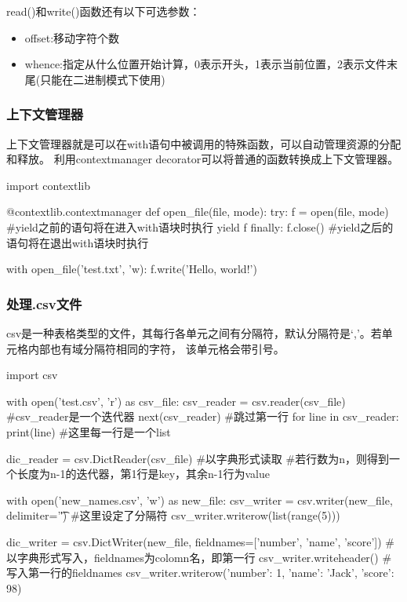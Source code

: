 \documentclass{article}
\begin{document}
        read()和write()函数还有以下可选参数：
        \begin{itemize}
          \item offset:移动字符个数
          \item whence:指定从什么位置开始计算，0表示开头，1表示当前位置，2表示文件末尾(只能在二进制模式下使用)
        \end{itemize}

      \subsubsection{上下文管理器}
        上下文管理器就是可以在with语句中被调用的特殊函数，可以自动管理资源的分配和释放。
        利用contextmanager decorator可以将普通的函数转换成上下文管理器。
        \begin{codeblock}[language=python, caption={contextmanager}]
          import contextlib

          @contextlib.contextmanager
          def open_file(file, mode):
              try:
                  f = open(file, mode) #yield之前的语句将在进入with语块时执行
                  yield f
              finally:
                  f.close() #yield之后的语句将在退出with语块时执行

          with open_file('test.txt', 'w):
              f.write('Hello, world!')
        \end{codeblock}

      \subsubsection{处理.csv文件}
        csv是一种表格类型的文件，其每行各单元之间有分隔符，默认分隔符是`,'。若单元格内部也有域分隔符相同的字符，
        该单元格会带引号。
        \begin{codeblock}[language=python, caption={read and write .csv files}]
          import csv

          with open('test.csv', 'r') as csv_file:
            csv_reader = csv.reader(csv_file) #csv\_reader是一个迭代器
            next(csv_reader) #跳过第一行
            for line in csv_reader:
              print(line) #这里每一行是一个list

            dic_reader = csv.DictReader(csv_file) #以字典形式读取
            #若行数为n，则得到一个长度为n-1的迭代器，第1行是key，其余n-1行为value

          with open('new_names.csv', 'w') as new_file:
            csv_writer = csv.writer(new_file, delimiter='\t') #这里设定了分隔符
            csv_writer.writerow(list(range(5)))

            dic_writer = csv.DictWriter(new_file, fieldnames=['number', 'name', 'score'])
            #以字典形式写入，fieldnames为colomn名，即第一行
            csv_writer.writeheader() #写入第一行的fieldnames
            csv_writer.writerow({'number': 1, 'name': 'Jack', 'score': 98})
        \end{codeblock}
\end{document}
